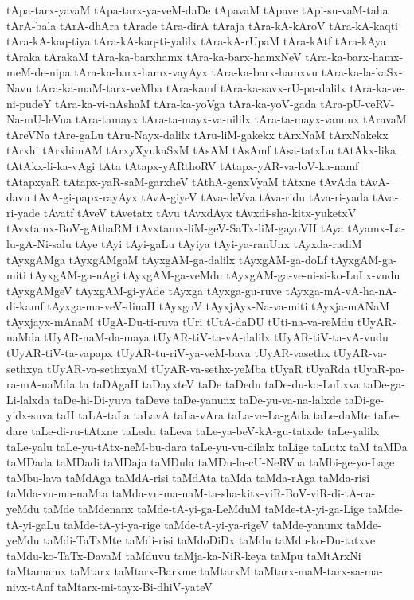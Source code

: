 {tApa-tarx-yavaM
tApa-tarx-ya-veM-daDe
tApavaM
tApave
tApi-su-vaM-taha
tArA-bala
tArA-dhAra
tArade
tAra-dirA
tAraja
tAra-kA-kAroV
tAra-kA-kaqti
tAra-kA-kaq-tiya
tAra-kA-kaq-ti-yalilx
tAra-kA-rUpaM
tAra-kAtf
tAra-kAya
tAraka
tArakaM
tAra-ka-barxhamx
tAra-ka-barx-hamxNeV
tAra-ka-barx-hamx-meM-de-nipa
tAra-ka-barx-hamx-vayAyx
tAra-ka-barx-hamxvu
tAra-ka-la-kaSx-Navu
tAra-ka-maM-tarx-veMba
tAra-kamf
tAra-ka-savx-rU-pa-dalilx
tAra-ka-ve-ni-pudeY
tAra-ka-vi-nAshaM
tAra-ka-yoVga
tAra-ka-yoV-gada
tAra-pU-veRV-Na-mU-leVna
tAra-tamayx
tAra-ta-mayx-va-nililx
tAra-ta-mayx-vanunx
tAravaM
tAreVNa
tAre-gaLu
tAru-Nayx-dalilx
tAru-liM-gakekx
tArxNaM
tArxNakekx
tArxhi
tArxhimAM
tArxyXyukaSxM
tAsAM
tAsAmf
tAsa-tatxLu
tAtAkx-lika
tAtAkx-li-ka-vAgi
tAta
tAtapx-yARthoRV
tAtapx-yAR-va-loV-ka-namf
tAtapxyaR
tAtapx-yaR-saM-garxheV
tAthA-genxVyaM
tAtxne
tAvAda
tAvA-davu
tAvA-gi-papx-rayAyx
tAvA-giyeV
tAva-deVva
tAva-ridu
tAva-ri-yada
tAva-ri-yade
tAvatf
tAveV
tAvetatx
tAvu
tAvxdAyx
tAvxdi-sha-kitx-yuketxV
tAvxtamx-BoV-gAthaRM
tAvxtamx-liM-geV-SaTx-liM-gayoVH
tAya
tAyamx-La-lu-gA-Ni-salu
tAye
tAyi
tAyi-gaLu
tAyiya
tAyi-ya-ranUnx
tAyxda-radiM
tAyxgAMga
tAyxgAMgaM
tAyxgAM-ga-dalilx
tAyxgAM-ga-doLf
tAyxgAM-ga-miti
tAyxgAM-ga-nAgi
tAyxgAM-ga-veMdu
tAyxgAM-ga-ve-ni-si-ko-LuLx-vudu
tAyxgAMgeV
tAyxgAM-gi-yAde
tAyxga
tAyxga-gu-ruve
tAyxga-mA-vA-ha-nA-di-kamf
tAyxga-ma-veV-dinaH
tAyxgoV
tAyxjAyx-Na-va-miti
tAyxja-mANaM
tAyxjayx-mAnaM
tUgA-Du-ti-ruva
tUri
tUtA-daDU
tUti-na-va-reMdu
tUyAR-naMda
tUyAR-naM-da-maya
tUyAR-tiV-ta-vA-dalilx
tUyAR-tiV-ta-vA-vudu
tUyAR-tiV-ta-vapapx
tUyAR-tu-riV-ya-veM-bava
tUyAR-vasethx
tUyAR-va-sethxya
tUyAR-va-sethxyaM
tUyAR-va-sethx-yeMba
tUyaR
tUyaRda
tUyaR-pa-ra-mA-naMda
ta
taDAgaH
taDayxteV
taDe
taDedu
taDe-du-ko-LuLxva
taDe-ga-Li-lalxda
taDe-hi-Di-yuva
taDeve
taDe-yanunx
taDe-yu-va-na-lalxde
taDi-ge-yidx-suva
taH
taLA-taLa
taLavA
taLa-vAra
taLa-ve-La-gAda
taLe-daMte
taLe-dare
taLe-di-ru-tAtxne
taLedu
taLeva
taLe-ya-beV-kA-gu-tatxde
taLe-yalilx
taLe-yalu
taLe-yu-tAtx-neM-bu-dara
taLe-yu-vu-dilalx
taLige
taLutx
taM
taMDa
taMDada
taMDadi
taMDaja
taMDula
taMDu-la-cU-NeRVna
taMbi-ge-yo-Lage
taMbu-lava
taMdAga
taMdA-risi
taMdAta
taMda
taMda-rAga
taMda-risi
taMda-vu-ma-naMta
taMda-vu-ma-naM-ta-sha-kitx-viR-BoV-viR-di-tA-ca-yeMdu
taMde
taMdenanx
taMde-tA-yi-ga-LeMduM
taMde-tA-yi-ga-Lige
taMde-tA-yi-gaLu
taMde-tA-yi-ya-rige
taMde-tA-yi-ya-rigeV
taMde-yanunx
taMde-yeMdu
taMdi-TaTxMte
taMdi-risi
taMdoDiDx
taMdu
taMdu-ko-Du-tatxve
taMdu-ko-TaTx-DavaM
taMduvu
taMja-ka-NiR-keya
taMpu
taMtArxNi
taMtamamx
taMtarx
taMtarx-Barxme
taMtarxM
taMtarx-maM-tarx-sa-ma-nivx-tAnf
taMtarx-mi-tayx-Bi-dhiV-yateV
}
